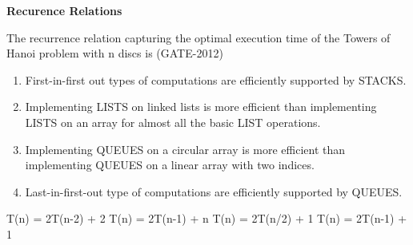 \centerline{\textbf{ \LARGE Recurence Relations}}

\begin{questyle}
  \question  The recurrence relation capturing the optimal execution time of the Towers of Hanoi problem with n discs is  (GATE-2012)
    \begin{enumerate}
        \item First-in-first out types of computations are efficiently supported by STACKS.
        \item Implementing LISTS on linked lists is more efficient than implementing LISTS on an array for almost all the basic LIST operations.
        \item Implementing QUEUES on a circular array is more efficient than implementing QUEUES on a linear array with two indices.
        \item Last-in-first-out type of computations are efficiently supported by QUEUES.
    \end{enumerate}

  \begin{choices}
    \choice         T(n) = 2T(n-2) + 2
    \choice         T(n) = 2T(n-1) + n
    \choice         T(n) = 2T(n/2) + 1
    \CorrectChoice  T(n) = 2T(n-1) + 1
  \end{choices}
\end{questyle}

